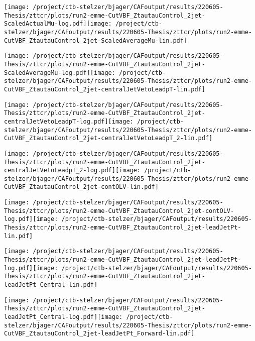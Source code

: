 \documentclass{article}
\begin{document}
\texttt{[image: /project/ctb-stelzer/bjager/CAFoutput/results/220605-Thesis/zttcr/plots/run2-emme-CutVBF\_ZtautauControl\_2jet-ScaledActualMu-log.pdf]}\texttt{[image: /project/ctb-stelzer/bjager/CAFoutput/results/220605-Thesis/zttcr/plots/run2-emme-CutVBF\_ZtautauControl\_2jet-ScaledAverageMu-lin.pdf]}

\texttt{[image: /project/ctb-stelzer/bjager/CAFoutput/results/220605-Thesis/zttcr/plots/run2-emme-CutVBF\_ZtautauControl\_2jet-ScaledAverageMu-log.pdf]}\texttt{[image: /project/ctb-stelzer/bjager/CAFoutput/results/220605-Thesis/zttcr/plots/run2-emme-CutVBF\_ZtautauControl\_2jet-centralJetVetoLeadpT-lin.pdf]}

\texttt{[image: /project/ctb-stelzer/bjager/CAFoutput/results/220605-Thesis/zttcr/plots/run2-emme-CutVBF\_ZtautauControl\_2jet-centralJetVetoLeadpT-log.pdf]}\texttt{[image: /project/ctb-stelzer/bjager/CAFoutput/results/220605-Thesis/zttcr/plots/run2-emme-CutVBF\_ZtautauControl\_2jet-centralJetVetoLeadpT\_2-lin.pdf]}

\texttt{[image: /project/ctb-stelzer/bjager/CAFoutput/results/220605-Thesis/zttcr/plots/run2-emme-CutVBF\_ZtautauControl\_2jet-centralJetVetoLeadpT\_2-log.pdf]}\texttt{[image: /project/ctb-stelzer/bjager/CAFoutput/results/220605-Thesis/zttcr/plots/run2-emme-CutVBF\_ZtautauControl\_2jet-contOLV-lin.pdf]}

\texttt{[image: /project/ctb-stelzer/bjager/CAFoutput/results/220605-Thesis/zttcr/plots/run2-emme-CutVBF\_ZtautauControl\_2jet-contOLV-log.pdf]}\texttt{[image: /project/ctb-stelzer/bjager/CAFoutput/results/220605-Thesis/zttcr/plots/run2-emme-CutVBF\_ZtautauControl\_2jet-leadJetPt-lin.pdf]}

\texttt{[image: /project/ctb-stelzer/bjager/CAFoutput/results/220605-Thesis/zttcr/plots/run2-emme-CutVBF\_ZtautauControl\_2jet-leadJetPt-log.pdf]}\texttt{[image: /project/ctb-stelzer/bjager/CAFoutput/results/220605-Thesis/zttcr/plots/run2-emme-CutVBF\_ZtautauControl\_2jet-leadJetPt\_Central-lin.pdf]}

\texttt{[image: /project/ctb-stelzer/bjager/CAFoutput/results/220605-Thesis/zttcr/plots/run2-emme-CutVBF\_ZtautauControl\_2jet-leadJetPt\_Central-log.pdf]}\texttt{[image: /project/ctb-stelzer/bjager/CAFoutput/results/220605-Thesis/zttcr/plots/run2-emme-CutVBF\_ZtautauControl\_2jet-leadJetPt\_Forward-lin.pdf]}
\end{document}
